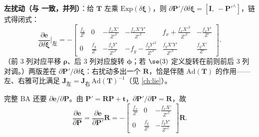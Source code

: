 \begin{derivation}
\textbf{左扰动（与\cite{gaoxiang2019slam14} 一致，并列）}：给 $\mathbf{T}$ 左乘 $\mathrm{Exp}(\delta\boldsymbol{\xi})$，则 $\partial\mathbf{P}'/\partial\delta\boldsymbol{\xi}=[\mathbf{I},\ -\mathbf{P}'^\wedge]$，链式得闭式：
\begin{equation}
  \frac{\partial\mathbf{e}}{\partial\delta\boldsymbol{\xi}}\Big|_{\text{左}}
  =-\begin{bmatrix}
  \frac{f_x}{Z'} & 0 & -\frac{f_xX'}{Z'^2} & -\frac{f_xX'Y'}{Z'^2} & f_x+\frac{f_xX'^2}{Z'^2} & -\frac{f_xY'}{Z'}\\[3pt]
  0 & \frac{f_y}{Z'} & -\frac{f_yY'}{Z'^2} & -f_y-\frac{f_yY'^2}{Z'^2} & \frac{f_yX'Y'}{Z'^2} & \frac{f_yX'}{Z'}
  \end{bmatrix}.
  \label{eq:vo-jac-left}
\end{equation}
（前 $3$ 列对应平移 $\boldsymbol{\rho}$、后 $3$ 列对应旋转 $\boldsymbol{\phi}$；若 $\se(3)$ 定义旋转在前则前后 $3$ 列对调。）两版差在 $\partial\mathbf{P}'/\partial\delta\boldsymbol{\xi}$：右扰动多出一个 $\mathbf{R}$，恰是伴随 $\mathrm{Ad}(\mathbf{T})$ 的作用——左、右雅可比满足 $\mathbf{J}_{\text{左}}=\mathbf{J}_{\text{右}}\,\mathrm{Ad}(\mathbf{T})^{-1}$（见 \cref{ch:lie}）。
\end{derivation}

\begin{derivation}
\label{thm:vo-de-dP-world}
完整 BA 还要 $\partial\mathbf{e}/\partial\mathbf{P}$。由 $\mathbf{P}'=\mathbf{R}\mathbf{P}+\mathbf{t}$，$\partial\mathbf{P}'/\partial\mathbf{P}=\mathbf{R}$，故\cite{gaoxiang2019slam14}
\begin{equation}
  \frac{\partial\mathbf{e}}{\partial\mathbf{P}}=\frac{\partial\mathbf{e}}{\partial\mathbf{P}'}\mathbf{R}
  =-\begin{bmatrix}\frac{f_x}{Z'}&0&-\frac{f_xX'}{Z'^2}\\0&\frac{f_y}{Z'}&-\frac{f_yY'}{Z'^2}\end{bmatrix}\mathbf{R}.
  \label{eq:vo-de-dPworld}
\end{equation}
\end{derivation}

